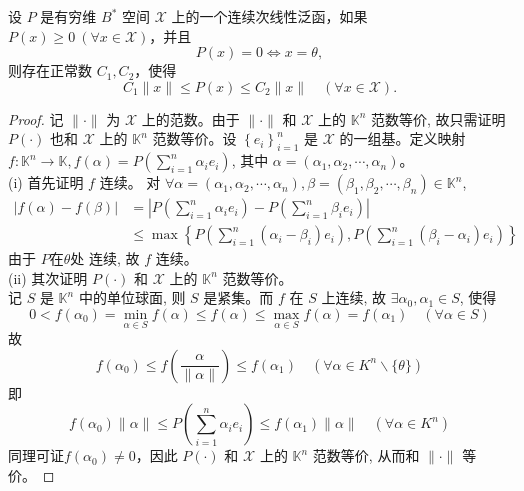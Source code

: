 \documentclass[lang=cn,newtx,10pt,scheme=chinese,thmcnt=chapter]{elegantbook}
\begin{document}
\begin{theorem}
设 $P$ 是有穷维 ${B}^*$ 空间 $\mathscr{X}$ 上的一个连续次线性泛函，如果 $P(x) \geqslant 0 \ (\forall x \in \mathscr{X})$，并且
\[
P(x) = 0 \Longleftrightarrow x = \theta,
\]
则存在正常数 $C_1, C_2$，使得
\[
C_1 \|x\| \leqslant P(x) \leqslant C_2 \|x\| \quad (\forall x \in \mathscr{X}).
\]
\end{theorem}
\begin{proof}
记 $\|\cdot\|$ 为 $\mathscr{X}$ 上的范数。由于 $\|\cdot\|$ 和 $\mathscr{X}$ 上的 $\mathbb{K} ^n$ 范数等价, 故只需证明 $P(\cdot)$ 也和 $\mathscr{X}$ 上的 $\mathbb{K} ^n$ 范数等价。设 $\left\{e_i\right\}_{i=1}^n$ 是 $\mathscr{X}$ 的一组基。定义映射 $f: \mathbb{K} ^n \rightarrow \mathbb{K} , f(\alpha)=P\left(\sum_{i=1}^n \alpha_i e_i\right)$, 其中 $\alpha=\left(\alpha_1, \alpha_2, \cdots, \alpha_n\right) 。$\\
(i) 首先证明 $f$ 连续。
对 $\forall \alpha=\left(\alpha_1, \alpha_2, \cdots, \alpha_n\right), \beta=\left(\beta_1, \beta_2, \cdots, \beta_n\right) \in \mathbb{K} ^n$,
\begin{equation*}
\begin{aligned}
|f(\alpha)-f(\beta)| & =\left|P\left(\sum_{i=1}^n \alpha_i e_i\right)-P\left(\sum_{i=1}^n \beta_i e_i\right)\right| \\
& \leqslant \max \left\{P\left(\sum_{i=1}^n\left(\alpha_i-\beta_i\right) e_i\right), P\left(\sum_{i=1}^n\left(\beta_i-\alpha_i\right) e_i\right)\right\}
\end{aligned}
\end{equation*}
由于 $P$在$\theta$处 连续, 故 $f$ 连续。\\
(ii) 其次证明 $P(\cdot)$ 和 $\mathscr{X}$ 上的 $\mathbb{K} ^n$ 范数等价。\\
记 $S$ 是 $\mathbb{K} ^n$ 中的单位球面, 则 $S$ 是紧集。而 $f$ 在 $S$ 上连续, 故 $\exists \alpha_0, \alpha_1 \in S$, 使得
\begin{equation*}
0<f\left(\alpha_0\right)=\min _{\alpha \in S} f(\alpha) \leqslant f(\alpha) \leqslant \max _{\alpha \in S} f(\alpha)=f\left(\alpha_1\right) \quad(\forall \alpha \in S)
\end{equation*}
故
\begin{equation*}
f\left(\alpha_0\right) \leqslant f\left(\frac{\alpha}{\|\alpha\|}\right) \leqslant f\left(\alpha_1\right) \quad\left(\forall \alpha \in K ^n \backslash\{\theta\}\right)
\end{equation*}
即
\begin{equation*}
f\left(\alpha_0\right)\|\alpha\| \leqslant P\left(\sum_{i=1}^n \alpha_i e_i\right) \leqslant f\left(\alpha_1\right)\|\alpha\| \quad\left(\forall \alpha \in K ^n\right)
\end{equation*}
同理可证$f(\alpha_0)\neq 0$，因此 $P(\cdot)$ 和 $\mathscr{X}$ 上的 $\mathbb{K} ^n$ 范数等价, 从而和 $\|\cdot\|$ 等价。
\end{proof}
\end{document}
